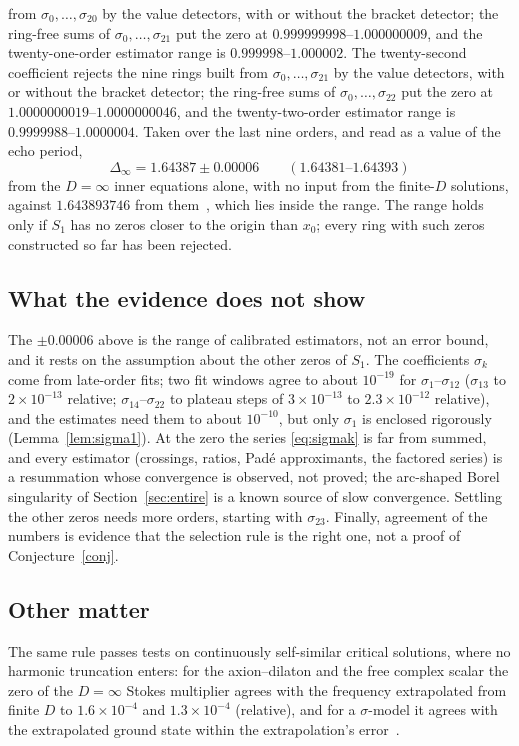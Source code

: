 \documentclass{amsart}
\numberwithin{equation}{section}
\theoremstyle{plain}
\theoremstyle{definition}
\theoremstyle{remark}
\newcommand{\Dinf}{\Delta_\infty}
\begin{document}
from $\sigma_0,\dots,\sigma_{20}$ by the value detectors, with or without the bracket detector; the ring-free sums
of $\sigma_0,\dots,\sigma_{21}$ put the zero at $0.999999998$--$1.000000009$, and
the twenty-one-order estimator range is $0.999998$--$1.000002$. The twenty-second coefficient rejects the nine rings
built from $\sigma_0,\dots,\sigma_{21}$ by the value detectors, with or without the bracket detector; the ring-free
sums of $\sigma_0,\dots,\sigma_{22}$ put the zero at $1.0000000019$--$1.0000000046$, and
the twenty-two-order estimator range is $0.9999988$--$1.0000004$. Taken over the
last nine orders, and read as a value of the echo period,
\[
\Dinf = 1.64387 \pm 0.00006 \qquad (1.64381\text{--}1.64393)
\]
from the $D = \infty$ inner equations alone, with no input from the finite-$D$ solutions, against $1.643893746$ from
them~\cite{companion}, which lies inside the range. The range holds only if $S_1$ has no zeros closer to the origin
than $x_0$; every ring with such zeros constructed so far has been rejected.

\subsection{What the evidence does not show}
The $\pm0.00006$ above is the range of calibrated estimators, not an error bound, and it rests on the assumption about the
other zeros of $S_1$.
The coefficients $\sigma_k$ come from late-order fits; two fit windows agree to about $10^{-19}$ for $\sigma_1$--$\sigma_{12}$ ($\sigma_{13}$ to $2\times10^{-13}$ relative; $\sigma_{14}$--$\sigma_{22}$ to plateau steps of $3\times10^{-13}$ to $2.3\times10^{-12}$ relative), and the
estimates need them to about $10^{-10}$, but only $\sigma_1$ is enclosed rigorously (Lemma~\ref{lem:sigma1}). At the zero the series \eqref{eq:sigmak} is far from summed, and every
estimator (crossings, ratios, Pad\'e approximants, the factored series) is a resummation whose convergence is observed, not
proved; the arc-shaped Borel singularity of Section~\ref{sec:entire} is a known source of slow convergence. Settling the other zeros needs more orders, starting with $\sigma_{23}$. Finally, agreement of the numbers is evidence that the selection rule is the right one, not a proof
of Conjecture~\ref{conj}.

\subsection{Other matter}
The same rule passes tests on continuously self-similar critical solutions, where no harmonic truncation enters: for the
axion--dilaton and the free complex scalar the zero of the $D = \infty$ Stokes multiplier agrees with the frequency
extrapolated from finite $D$ to $1.6\times10^{-4}$ and $1.3\times10^{-4}$ (relative), and for a $\sigma$-model it agrees
with the extrapolated ground state within the extrapolation's error~\cite{companion}.
\end{document}
